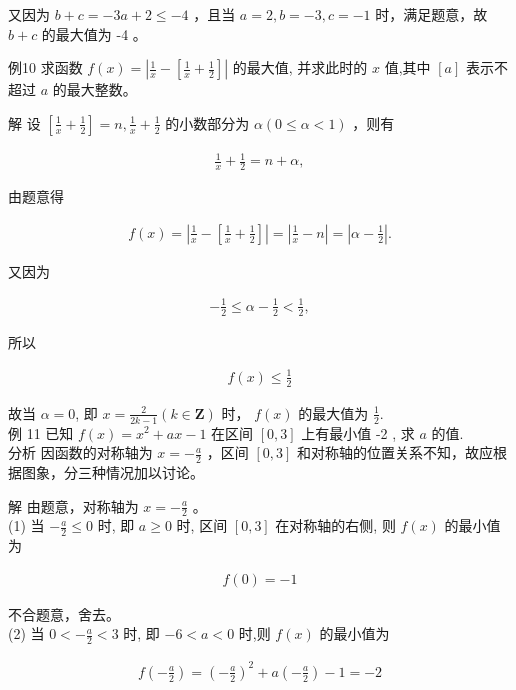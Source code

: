 \documentclass[10pt]{article}
\begin{document}
又因为 $b+c=-3 a+2 \leqslant-4$ ，且当 $a=2, b=-3, c=-1$ 时，满足题意，故 $b+c$ 的最大值为 -4 。

例10 求函数 $f(x)=\left|\frac{1}{x}-\left[\frac{1}{x}+\frac{1}{2}\right]\right|$ 的最大值, 并求此时的 $x$ 值,其中 $[a]$ 表示不超过 $a$ 的最大整数。

解 设 $\left[\frac{1}{x}+\frac{1}{2}\right]=n, \frac{1}{x}+\frac{1}{2}$ 的小数部分为 $\alpha(0 \leqslant \alpha<1)$ ，则有

\begin{align*}
\frac{1}{x}+\frac{1}{2}=n+\alpha,
\end{align*}

由题意得

\begin{align*}
f(x)=\left|\frac{1}{x}-\left[\frac{1}{x}+\frac{1}{2}\right]\right|=\left|\frac{1}{x}-n\right|=\left|\alpha-\frac{1}{2}\right| .
\end{align*}

又因为

\begin{align*}
-\frac{1}{2} \leqslant \alpha-\frac{1}{2}<\frac{1}{2},
\end{align*}

所以

\begin{align*}
f(x) \leqslant \frac{1}{2}
\end{align*}

故当 $\alpha=0$, 即 $x=\frac{2}{2 k-1}(k \in \mathbf{Z})$ 时， $f(x)$ 的最大值为 $\frac{1}{2}$.\\
例 11 已知 $f(x)=x^{2}+a x-1$ 在区间 $[0,3]$ 上有最小值 -2 , 求 $a$ 的值.\\
分析 因函数的对称轴为 $x=-\frac{a}{2}$ ，区间 $[0,3]$ 和对称轴的位置关系不知，故应根据图象，分三种情况加以讨论。

解 由题意，对称轴为 $x=-\frac{a}{2}$ 。\\
(1) 当 $-\frac{a}{2} \leqslant 0$ 时, 即 $a \geqslant 0$ 时, 区间 $[0,3]$ 在对称轴的右侧, 则 $f(x)$ 的最小值为

\begin{align*}
f(0)=-1
\end{align*}

不合题意，舍去。\\
(2) 当 $0<-\frac{a}{2}<3$ 时, 即 $-6<a<0$ 时,则 $f(x)$ 的最小值为

\begin{align*}
f\left(-\frac{a}{2}\right)=\left(-\frac{a}{2}\right)^{2}+a\left(-\frac{a}{2}\right)-1=-2
\end{align*}
\end{document}
